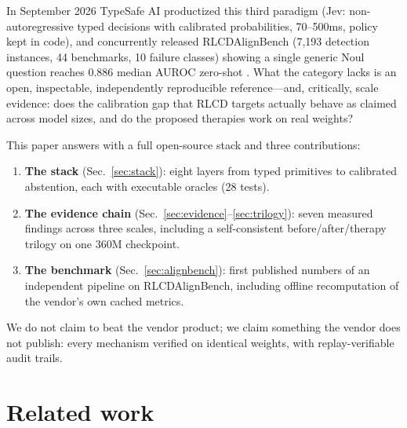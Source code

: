 \documentclass[11pt]{article}
\begin{document}
In September 2026 TypeSafe AI productized this third paradigm (Jev:
non-autoregressive typed decisions with calibrated probabilities,
70--500ms, policy kept in code), and concurrently released RLCDAlignBench
(7,193 detection instances, 44 benchmarks, 10 failure classes) showing
a single generic Noul question reaches 0.886 median AUROC zero-shot
\citep{jev,rlcdalignbench}. What the category lacks is an open,
inspectable, independently reproducible reference---and, critically,
scale evidence: does the calibration gap that RLCD targets actually
behave as claimed across model sizes, and do the proposed therapies
work on real weights?

This paper answers with a full open-source stack and three
contributions:
\begin{enumerate}
\item \textbf{The stack} (Sec.~\ref{sec:stack}): eight layers from typed
primitives to calibrated abstention, each with executable oracles
(28 tests).
\item \textbf{The evidence chain} (Sec.~\ref{sec:evidence}--\ref{sec:trilogy}):
seven measured findings across three scales, including a
self-consistent before/after/therapy trilogy on one 360M checkpoint.
\item \textbf{The benchmark} (Sec.~\ref{sec:alignbench}): first published
numbers of an independent pipeline on RLCDAlignBench, including offline
recomputation of the vendor's own cached metrics.
\end{enumerate}

We do not claim to beat the vendor product; we claim something the
vendor does not publish: every mechanism verified on identical weights,
with replay-verifiable audit trails.

\section{Related work}
\end{document}
